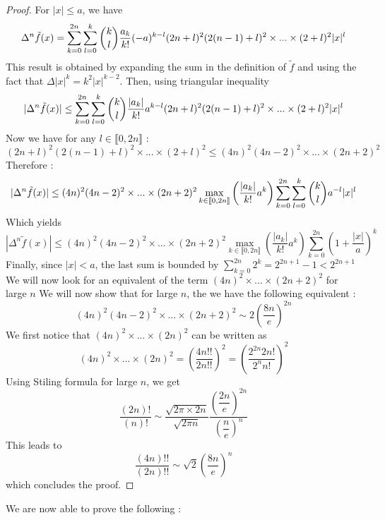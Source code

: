 \documentclass[11pt,a4paper]{article}
\begin{document}
\begin{proof} For $|x| \leq a$, we have
\[\Delta^n \tilde{f}(x) = \sum_{k=0}^{2n}\sum_{l=0}^k \dbinom{k}{l}\dfrac{a_k}{k!}(-a)^{k-l}(2n+l)^2 (2(n-1)+l)^2\times ... \times (2+l)^2|x|^l\]
This result is obtained by expanding the sum in the definition of $\tilde{f}$ and using the fact that $\Delta |x|^k = k^2|x|^{k-2}$. Then, using triangular inequality
\[|\Delta^n \tilde{f}(x)| \leq \sum_{k=0}^{2n}\sum_{l=0}^k \dbinom{k}{l}\dfrac{|a_k|}{k!}a^{k-l}(2n+l)^2(2(n-1)+l)^2\times ... \times (2+l)^2|x|^l\]
Now we have for any $l\in\llbracket 0,2n\rrbracket$ : \[(2n+l)^2(2(n-1)+l)^2\times ... \times (2+l)^2 \leq (4n)^2(4n-2)^2 \times ... \times (2n+2)^2\]
Therefore : 
\[|\Delta^n \tilde{f}(x)| \leq (4n)^2(4n-2)^2 \times ... \times (2n+2)^2\max_{k\in\llbracket 0,2n\rrbracket}\left(\dfrac{|a_k|}{k!}a^k\right)\sum_{k=0}^{2n}\sum_{l=0}^k \dbinom{k}{l}a^{-l}|x|^l\]
Which yields
\[|\Delta^n \tilde{f}(x)| \leq (4n)^2(4n-2)^2 \times ... \times (2n+2)^2\max_{k\in\llbracket 0,2n\rrbracket}\left(\dfrac{|a_k|}{k!}a^k\right)\sum_{k=0}^{2n}\left(1+\frac{|x|}{a}\right)^k\]
Finally, since $|x|<a$, the last sum is bounded by $\displaystyle\sum_{k=0}^{2n}2^k = 2^{2n+1}-1 < 2^{2n+1}$
We will now look for an equivalent of the term $(4n)^2 \times ... \times (2n+2)^2$ for large $n$ 
We will now show that for large $n$, the we have the following equivalent : \[(4n)^2(4n-2)^2\times...\times (2n+2)^2 \sim 2\left(\dfrac{8n}{e}\right)^{2n}\]
We first notice that $(4n)^2\times...\times (2n)^2$ can be written as \[(4n)^2\times...\times (2n)^2 = \left(\dfrac{4n!!}{2n!!}\right)^2 = \left(\dfrac{2^{2n}2n!}{2^n n!}\right)^2\]
Using Stiling formula for large $n$, we get
\[\dfrac{(2n)!}{(n)!} \sim \dfrac{\sqrt{2\pi\times 2n}}{\sqrt{2\pi n}} \dfrac{\left(\dfrac{2n}{e}\right)^{2n}}{\left(\dfrac{n}{e}\right)^{n}}\]
This leads to 
\[\dfrac{(4n)!!}{(2n)!!} \sim \sqrt{2} \left(\dfrac{8n}{e}\right)^n \]
which concludes the proof. 
\end{proof}

We are now able to prove the following : 
\end{document}
